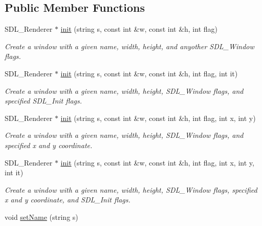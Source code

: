\subsection*{Public Member Functions}
\begin{DoxyCompactItemize}
\item 
S\+D\+L\+\_\+\+Renderer $\ast$ \hyperlink{classEngine_af02c5fcfad817c5c8bc0a3cacfd9d4f8}{init} (string s, const int \&w, const int \&h, int flag)\hypertarget{classEngine_af02c5fcfad817c5c8bc0a3cacfd9d4f8}{}\label{classEngine_af02c5fcfad817c5c8bc0a3cacfd9d4f8}

\begin{DoxyCompactList}\small\item\em Create a window with a given name, width, height, and anyother S\+D\+L\+\_\+\+Window flags. \end{DoxyCompactList}\item 
S\+D\+L\+\_\+\+Renderer $\ast$ \hyperlink{classEngine_aca16d18226665d75acad41b48a8da989}{init} (string s, const int \&w, const int \&h, int flag, int it)\hypertarget{classEngine_aca16d18226665d75acad41b48a8da989}{}\label{classEngine_aca16d18226665d75acad41b48a8da989}

\begin{DoxyCompactList}\small\item\em Create a window with a given name, width, height, S\+D\+L\+\_\+\+Window flags, and specified S\+D\+L\+\_\+\+Init flags. \end{DoxyCompactList}\item 
S\+D\+L\+\_\+\+Renderer $\ast$ \hyperlink{classEngine_a4f80e210f2ae48208eed4ad17c309120}{init} (string s, const int \&w, const int \&h, int flag, int x, int y)\hypertarget{classEngine_a4f80e210f2ae48208eed4ad17c309120}{}\label{classEngine_a4f80e210f2ae48208eed4ad17c309120}

\begin{DoxyCompactList}\small\item\em Create a window with a given name, width, height, S\+D\+L\+\_\+\+Window flags, and specified x and y coordinate. \end{DoxyCompactList}\item 
S\+D\+L\+\_\+\+Renderer $\ast$ \hyperlink{classEngine_aa96fc831b44b6aae0f499360609c574d}{init} (string s, const int \&w, const int \&h, int flag, int x, int y, int it)\hypertarget{classEngine_aa96fc831b44b6aae0f499360609c574d}{}\label{classEngine_aa96fc831b44b6aae0f499360609c574d}

\begin{DoxyCompactList}\small\item\em Create a window with a given name, width, height, S\+D\+L\+\_\+\+Window flags, specified x and y coordinate, and S\+D\+L\+\_\+\+Init flags. \end{DoxyCompactList}\item 
void \hyperlink{classEngine_ae59bcd31693811574953ba835ecb09bb}{set\+Name} (string s)\hypertarget{classEngine_ae59bcd31693811574953ba835ecb09bb}{}\label{classEngine_ae59bcd31693811574953ba835ecb09bb}


\end{DoxyCompactItemize}
